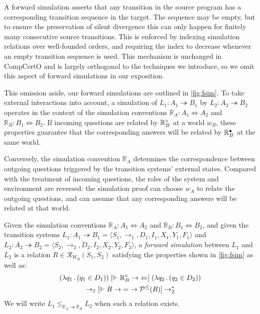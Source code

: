 \documentclass[sigplan,screen]{acmart}
\begin{document}
A forward simulation asserts that any transition in the source program
has a corresponding transition sequence in the target.
The sequence may be empty,
but to ensure the preservation of silent divergence
this can only happen for finitely many consecutive source transitions.
This is enforced by indexing simulation relations
over well-founded orders,
and requiring the index to decrease
whenever an empty transition sequence is used.
This mechanism is unchanged in CompCertO
and is largely orthogonal to the techniques we introduce,
so we omit this aspect of forward simulations
in our exposition.

This omission aside,
our forward simulations
are outlined in \autoref{fig:fsim}.
To take 
external interactions into account,
a simulation of
$L_1 : A_1 \twoheadrightarrow B_1$ by
$L_2 : A_2 \twoheadrightarrow B_2$
operates in the context of the simulation conventions
$\mathbb{R}_A : A_1 \Leftrightarrow A_2$ and
$\mathbb{R}_B : B_1 \Leftrightarrow B_2$.
If incoming questions %
are related by $\mathbb{R}_B^\circ$
at a world $w_B$,
these properties guarantee that the corresponding answers will be related
by $\mathbb{R}_B^\bullet$ at the same world.

Conversely,
the simulation convention $\mathbb{R}_A$
determines the correspondence between
outgoing questions triggered by
the transition systems' external states.
Compared with the treatment of incoming questions,
the roles of the system and environment are reversed:
the simulation proof can choose $w_A$
to relate the outgoing questions,
and can assume that any corresponding answers
will be related at that world.

\begin{definition} \label{def:fsim} %
Given
the simulation conventions
$\mathbb{R}_A : A_1 \Leftrightarrow A_2$ and
$\mathbb{R}_B : B_1 \Leftrightarrow B_2$,
and given
the transition systems
$L_1 : A_1 \twoheadrightarrow B_1 = \langle S_1, {\rightarrow}_1, D_1, I_1, X_1, Y_1, F_1 \rangle$ and
$L_2 : A_2 \twoheadrightarrow B_2 = \langle S_2, {\rightarrow}_2, D_2, I_2, X_2, Y_2, F_2 \rangle$,
a \emph{forward simulation} between $L_1$ and $L_2$
is a relation
$R \in \mathcal{R}_{W_B}(S_1, S_2)$
satisfying the properties shown in
\autoref{fig:fsim}
as well as:
\begin{gather*}
  (\lambda q_1 \, . \, (q_1 \in D_1))
  \mathrel{[{\Vdash \mathbb{R}_B^\circ \rightarrow {\Leftrightarrow}}]}
  (\lambda q_2 \, . \, (q_2 \in D_2))
  \\
  {\rightarrow_1}
  \mathrel{[{\Vdash R \rightarrow {=} \rightarrow \mathcal{P}^\le(R)}]}
  {\rightarrow_2^*}
\end{gather*}
We will write $L_1 \le_{\mathbb{R}_A \twoheadrightarrow \mathbb{R}_B} L_2$
when such a relation exists.
\end{definition}
\end{document}
